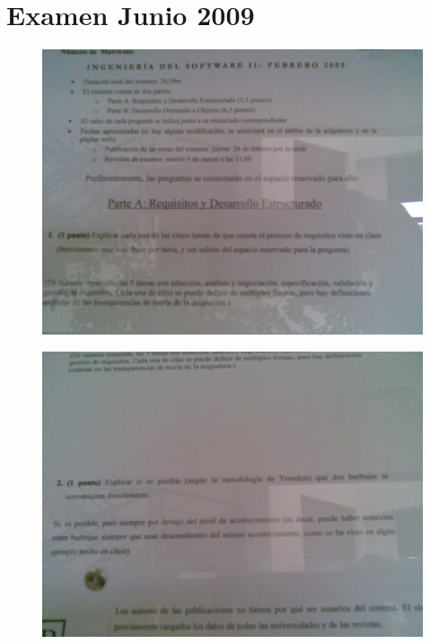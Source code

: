 \documentclass[12pt,a4paper]{report}
\begin{document}
\section{Examen Junio 2009}
\begin{figure}
  \includegraphics[width=\textwidth]{./images/jun/Imagen072.jpg}
\end{figure}
\begin{figure}
  \includegraphics[width=\textwidth]{./images/jun/Imagen074.jpg}
\end{figure}
\end{document}
